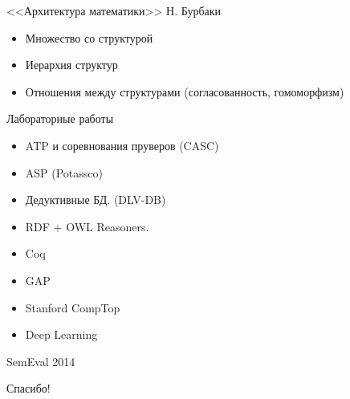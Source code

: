 \documentclass{beamer}
\begin{document}
\begin{frame}{<<Архитектура математики>> Н. Бурбаки}
\begin{itemize}
  \item Множество со структурой
  \item Иерархия структур
  \item Отношения между структурами (согласованность, гомоморфизм)
\end{itemize}
\end{frame}

\begin{frame}{Лабораторные работы}
\begin{itemize}
  \item ATP и соревнования пруверов (CASC)
  \item ASP (Potassco)
  \item Дедуктивные БД. (DLV-DB)
  \item RDF + OWL Reasoners. 
  \item Coq
  \item GAP 
  \item Stanford CompTop 
  \item Deep Learning
\end{itemize}
\end{frame}

\begin{frame}{SemEval 2014}
\end{frame}


\begin{frame}{}
\thispagestyle{empty}
\begin{center}
{\large Спасибо!}
\end{center}
\end{frame}


\end{document}
